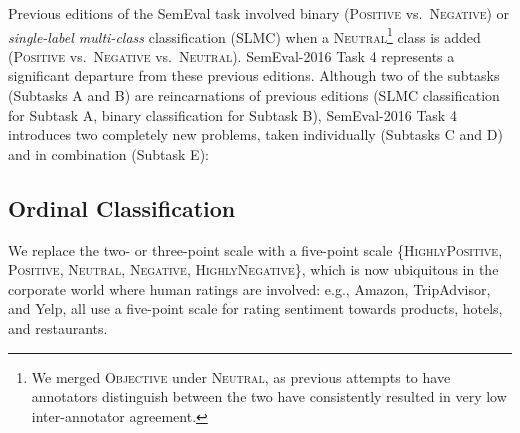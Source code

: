 \documentclass[11pt,letterpaper]{article}
\newif\ifdraft
\newcommand{\preslav}[1]{\ifdraft{\textcolor{blue}{[Preslav]: {#1}}}\else{\vspace{0ex}}\fi}
\newcommand{\fabrizio}[1]{\ifdraft{\textcolor{cyan}{[Fabrizio]: {#1}}}\else{\vspace{0ex}}\fi}
\begin{document}
Previous editions of the SemEval task involved binary
(\textsc{Positive} vs.\ \textsc{Negative}) or \emph{single-label multi-class} classification (SLMC) when a \textsc{Neutral}\footnote{
We merged \textsc{Objective} under \textsc{Neutral}, as previous attempts to have
annotators distinguish between the two have consistently resulted in
very low inter-annotator agreement.} 
class is added (\textsc{Positive}
vs.\ \textsc{Negative} vs.\ \textsc{Neutral}).
SemEval-2016 Task 4 represents a significant departure from these
previous editions.  Although two of the subtasks (Subtasks A and B)
are reincarnations of previous editions (SLMC classification for
Subtask A, binary classification for Subtask B), SemEval-2016 Task 4
introduces two completely new problems, taken individually (Subtasks C
and D) and in combination (Subtask E):

\subsection{Ordinal Classification}

We replace the 
two- or three-point scale with a
  five-point scale \{\textsc{HighlyPositive}, \textsc{Positive},
  \textsc{Neutral}, \textsc{Negative}, \textsc{HighlyNegative}\}, which is now
  ubiquitous in the corporate world where human ratings are involved:
  e.g., Amazon, TripAdvisor, and Yelp, 
  all use a five-point scale for rating sentiment towards products, hotels, and
  restaurants.
\end{document}
